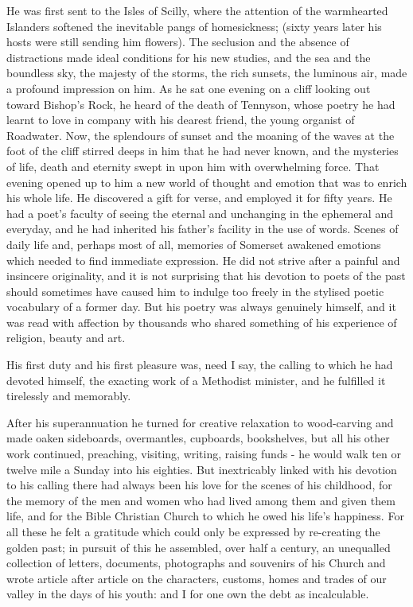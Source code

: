 He was first sent to the Isles of Scilly, where the attention of the warmhearted Islanders softened the inevitable pangs of homesickness; (sixty years later his hosts were still sending him flowers). The seclusion and the absence of distractions made ideal conditions for his new studies, and the sea and the boundless sky, the majesty of the storms, the rich sunsets, the luminous air, made a profound impression on him. As he sat one evening on a cliff looking out toward Bishop's Rock, he heard of the death of Tennyson, whose poetry he had learnt to love in company with his dearest friend, the young organist of Roadwater. Now, the splendours of sunset and the moaning of the waves at the foot of the cliff stirred deeps in him that he had never known, and the mysteries of life, death and eternity swept in upon him with overwhelming force. That evening opened up to him a new world of thought and emotion that was to enrich his whole life. He discovered a gift for verse, and employed it for fifty years. He had a poet's faculty of seeing the eternal and unchanging in the ephemeral and everyday, and he had inherited his father's facility in the use of words. Scenes of daily life and, perhaps most of all, memories of Somerset awakened emotions which needed to find immediate expression.
He did not strive after a painful and insincere originality, and it is not surprising that his devotion to poets of the past should sometimes have caused him to indulge too freely in the stylised poetic vocabulary of a former day. But his poetry was always genuinely himself, and it was read with affection by thousands who shared something of his experience of religion, beauty and art.

His first duty and his first pleasure was, need I say, the calling to which he had devoted himself, the exacting work of a Methodist minister, and he fulfilled it tirelessly and memorably.

After his superannuation he turned for creative relaxation to wood-carving and made oaken sideboards, overmantles, cupboards, bookshelves, but all his other work continued, preaching, visiting, writing, raising funds - he would walk ten or twelve mile a Sunday into his eighties. But inextricably linked with his devotion to his calling there had always been his love for the scenes of his childhood, for the memory of the men and women who had lived among them and given them life, and for the Bible Christian Church to which he owed his life's happiness. For all these he felt a gratitude which could only be expressed by re-creating the golden past; in pursuit of this he assembled, over half a century, an unequalled collection of letters, documents, photographs and souvenirs of his Church and wrote article after article on the characters, customs, homes and trades of our valley in the days of his youth: and I for one own the debt as incalculable.
 
